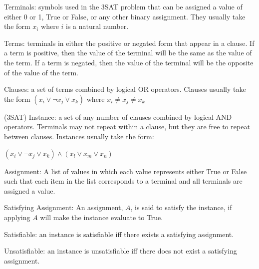 \documentclass[manuscript]{acmart}
\begin{document}
    \begin{definition}
        Terminals: symbols used in the 3SAT problem that can be assigned a value
        of either 0 or 1, True or False, or any other binary assignment. They usually
        take the form $x_i$ where $i$ is a natural number.
    \end{definition}
    \begin{definition}
        Terms: terminals in either the positive or negated form that appear in a clause.
        If a term is positive, then the value of the terminal will be the 
        same as the value of the term. If a term is negated, then the value
        of the terminal will be the opposite of the value of the term.
    \end{definition}
    \begin{definition}
        Clauses: a set of terms combined by logical OR operators.
        Clauses usually take the form 
        $(x_i \lor \neg x_j \lor x_k)$ where $x_i \neq x_j \neq x_k$
    \end{definition}
    \begin{definition}
        (3SAT) Instance: a set of any number of clauses combined by logical
        AND operators. Terminals may
        not repeat within a clause, but they are free to repeat between clauses. 
        Instances usually take the form:

        $(x_i \lor \neg x_j \lor x_k) \land (x_l \lor x_m \lor x_n)$
    \end{definition}
    \begin{definition}
        Assignment: A list of values in which each value represents either True
        or False such that each item in the list corresponds to a terminal and 
        all terminals are assigned a value.
    \end{definition}
    \begin{definition}
        Satisfying Assignment: An assignment, $A$, is said to satisfy the instance, 
        if applying $A$ will make the instance evaluate to True.
    \end{definition}
    \begin{definition}
        Satisfiable: an instance is satisfiable iff there exists a satisfying assignment.
    \end{definition}
    \begin{definition}
        Unsatisfiable: an instance is unsatisfiable iff there does not exist a satisfying assignment.
    \end{definition}
\end{document}
